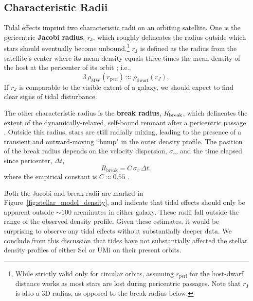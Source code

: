 \documentclass[times,trackchanges, twocolumn, twocolappendix]{aastex701}
\begin{document}
\subsection{Characteristic Radii}

Tidal effects imprint two characteristic radii on an orbiting satellite. One is
the pericentric \textbf{Jacobi radius}, $r_\text{J}$, which roughly delineates  the radius outside which stars should eventually become unbound.\footnote{ 
    While strictly valid only for circular orbits, assuming
$r_\text{peri}$ for the host-dwarf distance works as most stars are
lost during pericentric passages. Note that $r_\text{J}$ is also a 3D radius, as opposed to the break radius below.} $r_\text{J}$ is defined as the radius from the satellite's center where its mean density equals three times the mean density of the host at the pericenter of its orbit \citep[eq. 7-84]{BT1987}; i.e.,
\begin{equation}\label{eq:r_jacobi}
    3\, \bar \rho_\text{MW}(r_\text{peri}) \approx \bar \rho_\text{dwarf}(r_J),
\end{equation}
If $r_J$ is comparable to
the visible extent of a galaxy, we should expect to find clear signs of
tidal disturbance.

The other characteristic radius is the  \textbf{break radius}, $R_{\rm break}$, which delineates the extent of the dynamically-relaxed, self-bound remnant after a pericentric passage \citep{aguilar+white1986, navarro1989}. Outside this radius, stars are still radially mixing, leading to the presence of a transient and outward-moving ``bump" in the outer density profile. The position of the break radius depends on the velocity dispersion, $\sigma_v$, and the time elapsed
since pericenter, $\Delta t$, 
\begin{equation}\label{eq:r_break}
    R_\text{break} = C\,\sigma_{v}\,\Delta t,
\end{equation} 
where the empirical constant is $C \approx 0.55$  \citep{penarrubia+2009}.

Both the Jacobi and break radii are marked in Figure~\ref{fig:stellar_model_density}, and indicate that tidal effects should only  be apparent outside ${\sim}100$ arcminutes in either galaxy. 
These radii fall outside the range of the observed density profile. Given these estimates, it would be surprising to observe any tidal effects without substantially deeper data. We conclude from this discussion that tides have not substantially affected the stellar density profiles of either Scl or UMi on their present orbits.
\end{document}
